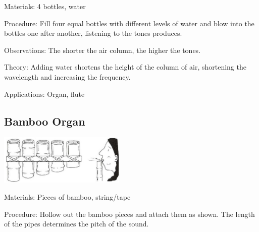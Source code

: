 \begin{multicols}{2}
\begin{description*}
\item[Materials:]{4 bottles, water}
\item[Procedure:]{Fill four equal bottles with different levels of water and blow into the bottles one after another, listening to the tones produces.}
\item[Observations:]{The shorter the air column, the higher the tones.}
\item[Theory:]{Adding water shortens the height of the column of air, shortening the wavelength and increasing the frequency.}
\item[Applications:]{Organ, flute}
\end{description*}

\columnbreak

\subsection{Bamboo Organ}

\begin{center}
\includegraphics[width=0.45\textwidth]{./img/vso/bamboo-organ.jpg}
\end{center}

\begin{description*}
\item[Materials:]{Pieces of bamboo, string/tape}
\item[Procedure:]{Hollow out the bamboo pieces and attach them as shown. The length of the pipes determines the pitch of the sound.}
\end{description*}


\end{multicols}
